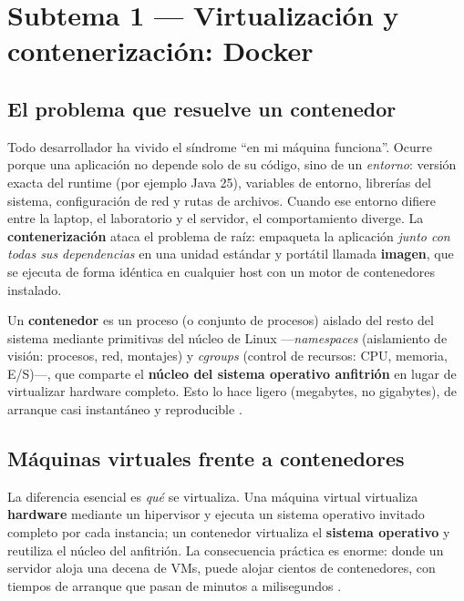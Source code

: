 \documentclass[11pt,a4paper]{article}
\begin{document}
\section{Subtema 1 --- Virtualizaci\'on y contenerizaci\'on: Docker}

\subsection{El problema que resuelve un contenedor}

Todo desarrollador ha vivido el s\'indrome ``en mi m\'aquina funciona''. Ocurre porque una aplicaci\'on no depende solo de su c\'odigo, sino de un \emph{entorno}: versi\'on exacta del runtime (por ejemplo Java 25), variables de entorno, librer\'ias del sistema, configuraci\'on de red y rutas de archivos. Cuando ese entorno difiere entre la laptop, el laboratorio y el servidor, el comportamiento diverge. La \textbf{contenerizaci\'on} ataca el problema de ra\'iz: empaqueta la aplicaci\'on \emph{junto con todas sus dependencias} en una unidad est\'andar y port\'atil llamada \textbf{imagen}, que se ejecuta de forma id\'entica en cualquier host con un motor de contenedores instalado.

\begin{defbox}
Un \textbf{contenedor} es un proceso (o conjunto de procesos) aislado del resto del sistema mediante primitivas del n\'ucleo de Linux ---\emph{namespaces} (aislamiento de visi\'on: procesos, red, montajes) y \emph{cgroups} (control de recursos: CPU, memoria, E/S)---, que comparte el \textbf{n\'ucleo del sistema operativo anfitri\'on} en lugar de virtualizar hardware completo. Esto lo hace ligero (megabytes, no gigabytes), de arranque casi instant\'aneo y reproducible \cite{merkel2014,bernstein2014}.
\end{defbox}

\subsection{M\'aquinas virtuales frente a contenedores}

La diferencia esencial es \emph{qu\'e} se virtualiza. Una m\'aquina virtual virtualiza \textbf{hardware} mediante un hipervisor y ejecuta un sistema operativo invitado completo por cada instancia; un contenedor virtualiza el \textbf{sistema operativo} y reutiliza el n\'ucleo del anfitri\'on. La consecuencia pr\'actica es enorme: donde un servidor aloja una decena de VMs, puede alojar cientos de contenedores, con tiempos de arranque que pasan de minutos a milisegundos \cite{pahl2019}.
\end{document}
